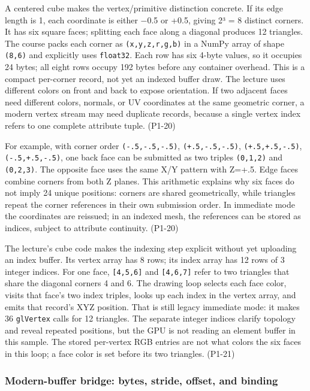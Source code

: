 A centered cube makes the vertex/primitive distinction concrete. If its edge length is 1, each coordinate is either −0.5 or +0.5, giving 2³ = 8 distinct corners. It has six square faces; splitting each face along a diagonal produces 12 triangles. The course packs each corner as \texttt{(x,y,z,r,g,b)} in a NumPy array of shape \texttt{(8,6)} and explicitly uses \texttt{float32}. Each row has six 4-byte values, so it occupies 24 bytes; all eight rows occupy 192 bytes before any container overhead. This is a compact per-corner record, not yet an indexed buffer draw. The lecture uses different colors on front and back to expose orientation. If two adjacent faces need different colors, normals, or UV coordinates at the same geometric corner, a modern vertex stream may need duplicate records, because a single vertex index refers to one complete attribute tuple. (P1-20)

For example, with corner order \texttt{(-.5,-.5,-.5)}, \texttt{(+.5,-.5,-.5)}, \texttt{(+.5,+.5,-.5)}, \texttt{(-.5,+.5,-.5)}, one back face can be submitted as two triples \texttt{(0,1,2)} and \texttt{(0,2,3)}. The opposite face uses the same X/Y pattern with Z=+.5. Edge faces combine corners from both Z planes. This arithmetic explains why six faces do not imply 24 unique positions: corners are shared geometrically, while triangles repeat the corner references in their own submission order. In immediate mode the coordinates are reissued; in an indexed mesh, the references can be stored as indices, subject to attribute continuity. (P1-20)

The lecture's cube code makes the indexing step explicit without yet uploading an index buffer. Its vertex array has 8 rows; its index array has 12 rows of 3 integer indices. For one face, \texttt{{[}4,5,6{]}} and \texttt{{[}4,6,7{]}} refer to two triangles that share the diagonal corners 4 and 6. The drawing loop selects each face color, visits that face's two index triples, looks up each index in the vertex array, and emits that record's XYZ position. That is still legacy immediate mode: it makes 36 \texttt{glVertex} calls for 12 triangles. The separate integer indices clarify topology and reveal repeated positions, but the GPU is not reading an element buffer in this sample. The stored per-vertex RGB entries are not what colors the six faces in this loop; a face color is set before its two triangles. (P1-21)

\subsubsection{Modern-buffer bridge: bytes, stride, offset, and binding}\label{03-visual-computing-i-ch018-modern-buffer-bridge-bytes-stride-offset-and-binding}

